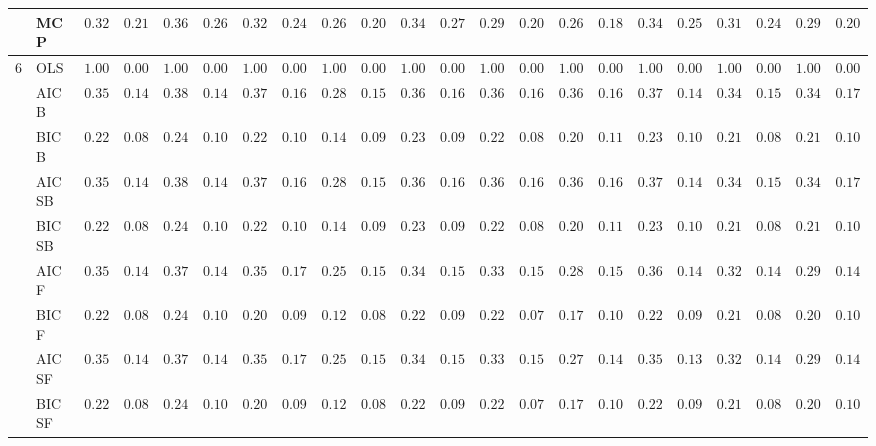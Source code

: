 \begin{tabular}{ll|ll|llllll|llllll|llllll}
 & MCP  & $0.3217$ & $0.2187$ & $0.3683$ & $0.2641$ & $0.3200$ & $0.2400$ & $0.2600$ & $0.2083$ & $0.3483$ & $0.2733$ & $0.2967$ & $0.2018$ & $0.2650$ & $0.1852$ & $0.3417$ & $0.2544$ & $0.3100$ & $0.2451$ & $0.2900$ & $0.2046$ \\\hline
6 & OLS  & $1.0000$ & $0.0000$ & $1.0000$ & $0.0000$ & $1.0000$ & $0.0000$ & $1.0000$ & $0.0000$ & $1.0000$ & $0.0000$ & $1.0000$ & $0.0000$ & $1.0000$ & $0.0000$ & $1.0000$ & $0.0000$ & $1.0000$ & $0.0000$ & $1.0000$ & $0.0000$ \\
 & AIC B  & $0.3583$ & $0.1486$ & $0.3867$ & $0.1496$ & $0.3750$ & $0.1681$ & $0.2883$ & $0.1587$ & $0.3617$ & $0.1625$ & $0.3650$ & $0.1670$ & $0.3617$ & $0.1642$ & $0.3767$ & $0.1472$ & $0.3467$ & $0.1511$ & $0.3433$ & $0.1754$ \\
 & BIC B  & $0.2217$ & $0.0856$ & $0.2433$ & $0.1017$ & $0.2233$ & $0.1039$ & $0.1467$ & $0.0956$ & $0.2300$ & $0.0941$ & $0.2250$ & $0.0866$ & $0.2000$ & $0.1161$ & $0.2333$ & $0.1005$ & $0.2133$ & $0.0889$ & $0.2183$ & $0.1051$ \\
 & AIC SB  & $0.3583$ & $0.1486$ & $0.3867$ & $0.1496$ & $0.3750$ & $0.1681$ & $0.2883$ & $0.1587$ & $0.3617$ & $0.1625$ & $0.3650$ & $0.1670$ & $0.3617$ & $0.1642$ & $0.3767$ & $0.1472$ & $0.3467$ & $0.1511$ & $0.3433$ & $0.1754$ \\
 & BIC SB  & $0.2217$ & $0.0856$ & $0.2433$ & $0.1017$ & $0.2233$ & $0.1039$ & $0.1467$ & $0.0956$ & $0.2300$ & $0.0941$ & $0.2267$ & $0.0871$ & $0.2000$ & $0.1161$ & $0.2333$ & $0.1005$ & $0.2133$ & $0.0889$ & $0.2183$ & $0.1051$ \\
 & AIC F  & $0.3517$ & $0.1458$ & $0.3783$ & $0.1438$ & $0.3517$ & $0.1723$ & $0.2500$ & $0.1544$ & $0.3450$ & $0.1522$ & $0.3350$ & $0.1598$ & $0.2867$ & $0.1500$ & $0.3600$ & $0.1435$ & $0.3283$ & $0.1469$ & $0.2933$ & $0.1482$ \\
 & BIC F  & $0.2217$ & $0.0856$ & $0.2400$ & $0.1041$ & $0.2067$ & $0.0921$ & $0.1233$ & $0.0842$ & $0.2283$ & $0.0937$ & $0.2217$ & $0.0788$ & $0.1783$ & $0.1039$ & $0.2250$ & $0.0929$ & $0.2117$ & $0.0882$ & $0.2067$ & $0.1008$ \\
 & AIC SF  & $0.3517$ & $0.1458$ & $0.3783$ & $0.1438$ & $0.3500$ & $0.1700$ & $0.2500$ & $0.1544$ & $0.3450$ & $0.1522$ & $0.3333$ & $0.1553$ & $0.2783$ & $0.1442$ & $0.3583$ & $0.1389$ & $0.3283$ & $0.1469$ & $0.2917$ & $0.1448$ \\
 & BIC SF  & $0.2217$ & $0.0856$ & $0.2400$ & $0.1041$ & $0.2067$ & $0.0921$ & $0.1233$ & $0.0842$ & $0.2283$ & $0.0937$ & $0.2217$ & $0.0788$ & $0.1783$ & $0.1039$ & $0.2250$ & $0.0929$ & $0.2117$ & $0.0882$ & $0.2067$ & $0.1008$ \\

\end{tabular}
